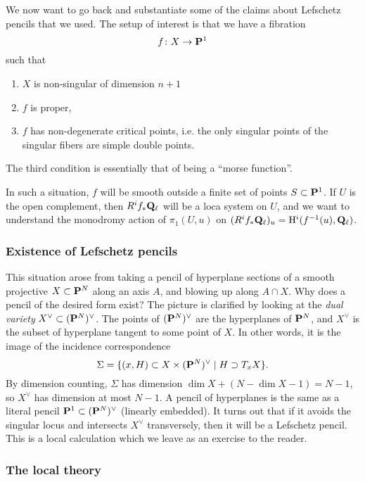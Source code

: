 We now want to go back and substantiate some of the claims about Lefschetz pencils that we used. The setup of interest is that we have a fibration
\[
f \colon X \rightarrow \mathbf{P}^1
\]
such that 
\begin{enumerate}
\item $X$ is non-singular of dimension $n+1$
\item $f$ is proper, 
\item $f$ has non-degenerate critical points, i.e. the only singular points of the singular fibers are simple double points. 
\end{enumerate}

The third condition is essentially that of being a ``morse function''. 

In such a situation, $f$ will be smooth outside a finite set of points $S \subset \mathbf{P}^1$. If $U$ is the open complement, then $R^i f_* \mathbf{Q}_{\ell}$ will be a loca system on $U$, and we want to understand the monodromy action of $\pi_1(U,u)$ on $(R^i f_* \mathbf{Q}_{\ell})_u = \mathrm{H}^i(f^{-1}(u), \mathbf{Q}_{\ell})$. 

\subsubsection{Existence of Lefschetz pencils}

This situation arose from taking a pencil of hyperplane sections of a smooth projective $X \subset \mathbf{P}^N$ along an axis $A$, and blowing up along $A \cap X$. Why does a pencil of the desired form exist? The picture is clarified by looking at the \emph{dual variety} $X^{\vee} \subset (\mathbf{P}^N)^{\vee}$. The points of $ (\mathbf{P}^N)^{\vee}$ are the hyperplanes of $\mathbf{P}^N$, and $X^{\vee}$ is the subset of hyperplane tangent to some point of $X$. In other words, it is the image of the incidence correspondence 
\begin{equation}\label{incidence_corres}
\Sigma = \{(x, H) \subset X \times (\mathbf{P}^N)^{\vee} \mid H \supset T_xX  \}.
\end{equation}
By dimension counting, $\Sigma$ has dimension $\dim X + (N-\dim X-1) = N-1$, so $X^{\vee}$ has dimension at most $N-1$. A pencil of hyperplanes is the same as a literal pencil $\mathbf{P}^1 \subset (\mathbf{P}^N)^{\vee}$ (linearly embedded). It turns out that if it avoids the singular locus and intersects $X^{\vee}$ transversely, then it will be a Lefschetz pencil. This is a local calculation which we leave as an exercise to the reader. 
\subsubsection{The local theory}

